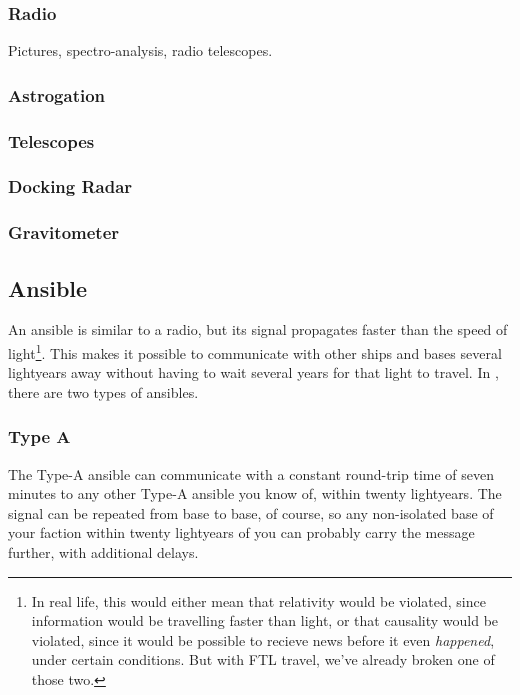 \subsubsection{Radio}
Pictures, spectro-analysis, radio telescopes.

\subsubsection{Astrogation}

\subsubsection{Telescopes}

\subsubsection{Docking Radar}

\subsubsection{Gravitometer}

\subsection{Ansible}
\par
An ansible is similar to a radio, but its signal propagates faster than the speed of light\footnote{In real life, this would either mean that relativity would be violated, since information would be travelling faster than light, or that causality would be violated, since it would be possible to recieve news before it even \textit{happened}, under certain conditions. But with FTL travel, we've already broken one of those two.}. This makes it possible to communicate with other ships and bases several lightyears away without having to wait several years for that light to travel. In \getTitle, there are two types of ansibles.

\subsubsection{Type A}
\par
The Type-A ansible can communicate with a constant round-trip time of seven minutes to any other Type-A ansible you know of, within twenty lightyears. The signal can be repeated from base to base, of course, so any non-isolated base of your faction within twenty lightyears of you can probably carry the message further, with additional delays.

